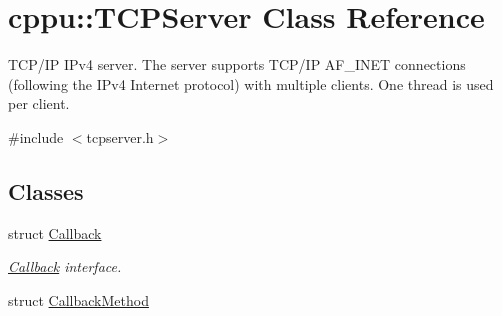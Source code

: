 \hypertarget{classcppu_1_1_t_c_p_server}{\section{cppu\+:\+:T\+C\+P\+Server Class Reference}
\label{classcppu_1_1_t_c_p_server}
}


T\+C\+P/\+I\+P I\+Pv4 server. The server supports T\+C\+P/\+I\+P A\+F\+\_\+\+I\+N\+E\+T connections (following the I\+Pv4 Internet protocol) with multiple clients. One thread is used per client.  




{\ttfamily \#include $<$tcpserver.\+h$>$}

\subsection*{Classes}
\begin{DoxyCompactItemize}
\item 
struct \hyperlink{structcppu_1_1_t_c_p_server_1_1_callback}{Callback}
\begin{DoxyCompactList}\small\item\em \hyperlink{structcppu_1_1_t_c_p_server_1_1_callback}{Callback} interface. \end{DoxyCompactList}\item 
struct \hyperlink{structcppu_1_1_t_c_p_server_1_1_callback_method}{Callback\+Method}
\end{DoxyCompactItemize}
